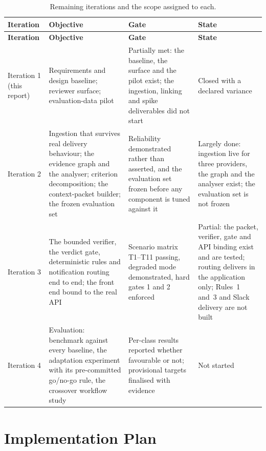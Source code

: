 \begin{longtable}{>{\raggedright\arraybackslash}p{} >{\raggedright\arraybackslash}p{} >{\raggedright\arraybackslash}p{} >{\raggedright\arraybackslash}p{}}
\caption{Remaining iterations and the scope assigned to each.}\label{tab:remaining-iterations}\\
\hline\textbf{Iteration} & \textbf{Objective} & \textbf{Gate} & \textbf{State} \\
\hline\endfirsthead
\hline\textbf{Iteration} & \textbf{Objective} & \textbf{Gate} & \textbf{State} \\
\hline\endhead
Iteration 1 (this report) & Requirements and design baseline; reviewer surface;
  evaluation-data pilot & Partially met: the baseline, the surface and the
  pilot exist; the ingestion, linking and spike deliverables did not start
  & Closed with a declared variance \\
Iteration 2 & Ingestion that survives real delivery behaviour; the evidence
  graph and the analyser; criterion decomposition; the context-packet builder;
  the frozen evaluation set & Reliability demonstrated rather than asserted,
  and the evaluation set frozen before any component is tuned against it
  & Largely done: ingestion live for three providers, the graph and the
  analyser exist; the evaluation set is not frozen \\
Iteration 3 & The bounded verifier, the verdict gate, deterministic rules and
  notification routing end to end; the front end bound to the real API &
  Scenario matrix T1--T11 passing, degraded mode demonstrated, hard gates 1 and
  2 enforced & Partial: the packet, verifier, gate and API binding exist and
  are tested; routing delivers in the application only; Rules~1 and~3 and
  Slack delivery are not built \\
Iteration 4 & Evaluation: benchmark against every baseline, the adaptation
  experiment with its pre-committed go/no-go rule, the crossover workflow study
  & Per-class results reported whether favourable or not; provisional targets
    finalised with evidence & Not started \\
\hline\end{longtable}

\section{Implementation Plan}
\label{sec:implementation-plan}

